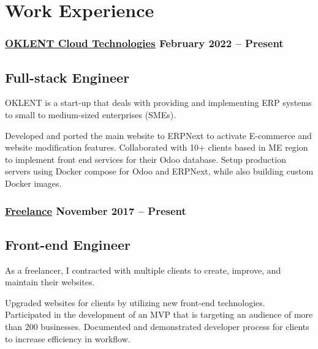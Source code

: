 \section*{Work Experience}
%
%
%
\medskip
\subsubsection*{
  \href{https://oklent.com/}{OKLENT Cloud Technologies}
  \hspace*{\fill}
  February 2022 -- Present
}
\subsection*{Full-stack Engineer}
OKLENT is a start-up that deals with providing and implementing ERP systems to small to medium-sized enterprises (SMEs).\smallskip
\smallskip
\begin{tasks}
  \task Developed and ported the main website to ERPNext to activate E-commerce and website modification features.
  \task Collaborated with 10+ clients based in ME region to implement front end services for their Odoo database.
  \task Setup production servers using Docker compose for Odoo and ERPNext, while also building custom Docker images.
\end{tasks}
%
%
\medskip
\subsubsection*{
  \href{https://bumbleboss.xyz/}{Freelance}
  \hspace*{\fill}
  November 2017 -- Present
}
\subsection*{Front-end Engineer}
As a freelancer, I contracted with multiple clients to create, improve, and maintain their websites.
\smallskip
\begin{tasks}
  \task Upgraded websites for clients by utilizing new front-end technologies.
  \task Participated in the development of an MVP that is targeting an audience of more than 200 businesses.
  \task Documented and demonstrated developer process for clients to increase efficiency in workflow.
\end{tasks}